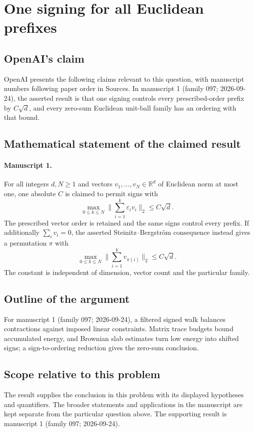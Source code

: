 \documentclass[11pt]{article}
\begin{document}
\section*{One signing for all Euclidean prefixes}

\subsection{OpenAI's claim}
OpenAI presents the following claims relevant to this question, with manuscript numbers following paper order in Sources. In manuscript 1 (family 097; 2026-09-24), the asserted result is that one signing controls every prescribed-order prefix by $C\sqrt d$, and every zero-sum Euclidean unit-ball family has an ordering with that bound.

\subsection{Mathematical statement of the claimed result}
\paragraph{Manuscript 1.}
For all integers $d,N\ge1$ and vectors $v_1,\ldots,v_N\in\mathbb R^d$ of Euclidean norm at most one, one absolute $C$ is claimed to permit signs with
\[
 \max_{0\le k\le N}\|\sum_{i=1}^k\varepsilon_iv_i\|_2\le C\sqrt d.
\]
The prescribed vector order is retained and the same signs control every prefix. If additionally $\sum_iv_i=0$, the asserted Steinitz--Bergstr\"om consequence instead gives a permutation $\pi$ with
\[
 \max_{0\le k\le N}\|\sum_{i=1}^kv_{\pi(i)}\|_2\le C\sqrt d.
\]
The constant is independent of dimension, vector count and the particular family.

\subsection{Outline of the argument}
For manuscript 1 (family 097; 2026-09-24), a filtered signed walk balances contractions against imposed linear constraints. Matrix trace budgets bound accumulated energy, and Brownian slab estimates turn low energy into shifted signs; a sign-to-ordering reduction gives the zero-sum conclusion.

\subsection{Scope relative to this problem}
The result supplies the conclusion in this problem with its displayed hypotheses and quantifiers. The broader statements and applications in the manuscript are kept separate from the particular question above. The supporting result is manuscript 1 (family 097; 2026-09-24).
\end{document}
